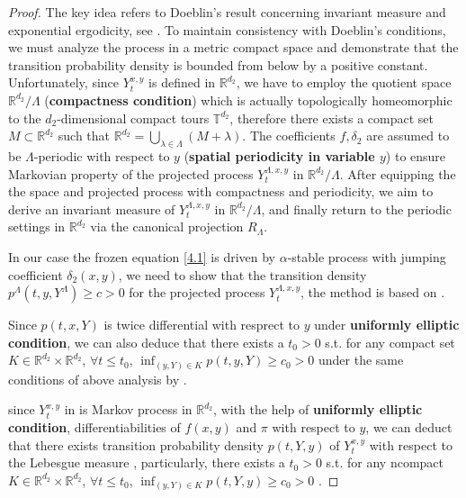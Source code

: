 \documentclass[11pt,reqno]{amsart}
\numberwithin{equation}{section}
\begin{document}
\begin{proof}
The key idea refers to Doeblin's result concerning invariant measure and exponential ergodicity, see \cite[365, Theorem 3.1]{BLP}. To maintain consistency with Doeblin's conditions, we must analyze the process in a metric compact space and demonstrate that the transition probability density is bounded from below by a positive constant. Unfortunately, since $Y_{t}^{x,y}$ is defined in $\mathbb{R}^{d_{2}}$, we have to employ the quotient space $\mathbb{R}^{d_{2}}/\Lambda$ (\textbf{compactness condition}) which is actually topologically homeomorphic to the $d_{2}$-dimensional compact tours $\mathbb{T}^{d_{2}}$, therefore there exists a compact set  $M\subset \mathbb{R}^{d_{2}}$ such that $\mathbb{R}^{d_{2}}=\bigcup_{\lambda\in \Lambda}(M+\lambda)$. The coefficients $f,\delta_{2}$ are assumed to be $\Lambda$-periodic with respect to $y$ (\textbf{spatial periodicity in variable $y$}) to ensure Markovian  property of the projected process $Y_{t}^{\Lambda,x,y}$ in $\mathbb{R}^{d_{2}}/\Lambda$. After equipping the the space and projected process with compactness and periodicity, we aim to derive an invariant measure of $Y^{\Lambda,x,y}_{t}$ in $\mathbb{R}^{d_{2}}/\Lambda$, and finally return to the periodic settings in $\mathbb{R}^{d_{2}}$ via the canonical projection $R_{\Lambda}$.
 
In our case the frozen equation \eqref{4.1} is driven by $\alpha$-stable process with jumping coefficient $\delta_{2}(x,y)$, %
we need to show that the transition density $p^{\Lambda}(t,y,Y^{\Lambda})\geq c>0$ for the projected process $Y_{t}^{\Lambda,x,y}$, the method is based on \cite[743, Theorem 3.1; 749, Proposition 3.4; 750, Theorem 3.2]{VK}.


Since $p(t,x,Y)$ is twice differential with resprect to $y$ under \textbf{uniformly elliptic condition}, we can also deduce that there exists a $t_{0}>0$ s.t. for any compact set $K\in \mathbb{R}^{d_{2}}\times\mathbb{R}^{d_{2}}$,  $\forall t\leq t_{0}$,  $\inf_{(y,Y)\in K } p(t,y,Y)\geq c_{0}>0$ under the same conditions of above analysis by \cite[749, Proposition 3.4; 750, Theorem 3.2]{VK}.


\iffalse
since $Y_{t}^{x,y}$ in  is Markov process in $\mathbb{R}^{d_{2}}$, with the help of \textbf{uniformly elliptic condition}, differentiabilities of $f(x,y)$ and $\pi$ with respect to $y$, we can deduct that there exists transition probability density $p(t,Y,y)$ of $Y_{t}^{x,y}$ with respect to the Lebesgue measure \cite[743 Theorem 3.1]{VK}, particularly,  there exists a $t_{0}>0$ s.t. for any ncompact $K\in \mathbb{R}^{d_{2}}\times\mathbb{R}^{d_{2}}$,  $\forall t\leq t_{0}$,  $\inf_{(y,Y)\in K } p(t,Y,y)\geq c_{0}>0$ \cite[749, Proposition 3.4; 750, Theorem 3.2]{VK}.


\end{proof}
\end{document}
